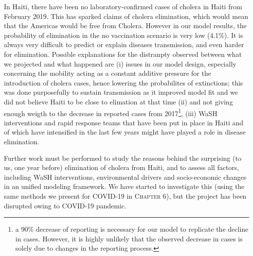  In Haiti, there have been no laboratory-confirmed cases of cholera in Haiti from February 2019. This has sparked claims of cholera elimination, which would mean that the Americas would be free from Cholera. However in our model results, the probability of elimination in the no vaccination scenario is very low (4.1\%). It is always very difficult to predict or explain diseases transmission, and even harder for elimination. Possible explanations for the distranpty observed between what we projected and what happened are (i) issues in our model design, especially concerning the mobility acting as a constant additive pressure for the introduction of cholera cases, hence lowering the probabilites of extinctions; this was done purposefully to sustain transmission as it improved model fit and we did not believe Haiti to be close to elimation at that time (ii) and not giving enough weigth to the decrease in reported cases from 2017\footnote[][-1.5\baselineskip]{a 90\% decrease of reporting is necessary for our model to replicate the decline in cases. However, it is highly unlikely that the observed decrease in cases is solely due to changes in the reporting process.}, (iii) WaSH interventions and rapid response teams that have been put in place in Haiti and of which have intensified in the last few years\cite{Rebaudet:CaseareaTargetedRapid:2019} might have played a role in disease elimination.
  
 Further work must be performed to study the reasons behind the surprising (to us, one year before) elimination of cholera from Haiti, and to assess all factors, including WaSH interventions, environmental drivers and socio-economic changes in an unified modeling framework. We have started to investigate this (using the same methods we present for COVID-19 in \textsc{Chapter 6}), but the project has been disrupted owing to COVID-19 pandemic.
 
